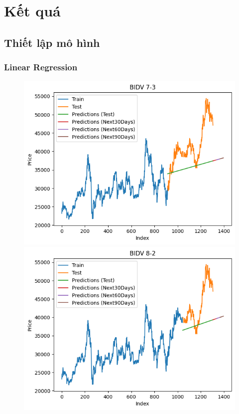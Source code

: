 \section{Kết quá}

\subsection{Thiết lập mô hình} 
\subsubsection{Linear Regression}
\begin{figure}[H]
    \centering
    \begin{minipage}{0.15\textwidth}
    \centering
    \includegraphics[width=1\textwidth]{resources/chapter-5/newdata1/result/BIDV_LinearRegression_7-3.png}
    \end{minipage}
    \hfill
    \begin{minipage}{0.15\textwidth}
    \centering
    \includegraphics[width=1\textwidth]{resources/chapter-5/newdata1/result/BIDV_LinearRegression_8-2.png}

\end{minipage}
\end{figure}
